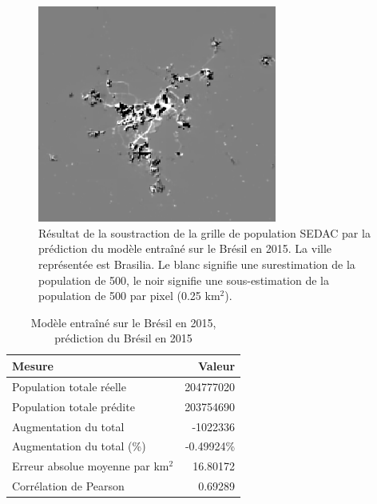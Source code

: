 \documentclass[a4paper, 11pt]{report}
\begin{document}
\begin{figure}
	\centering
	\includegraphics[width=0.7\textwidth]{img/act_vs_pred.png}
	\caption{Résultat de la soustraction de la grille de population SEDAC \cite{sedac} par la prédiction du modèle entraîné sur le Brésil en 2015. La ville représentée est Brasilia. Le blanc signifie une surestimation de la population de 500, le noir signifie une sous-estimation de la population de 500 par pixel (0.25 km$^2$).}
	\label{act_vs_pred}
\end{figure}

\begin{table}
	\centering
	\caption{Modèle entraîné sur le Brésil en 2015, prédiction du Brésil en 2015}
	\begin{tabular}{ l r }
		\hline
		\textbf{Mesure} & \textbf{Valeur} \\
		\hline\hline
		Population totale réelle & 204777020 \\
		\hline
		Population totale prédite & 203754690 \\
		\hline
		Augmentation du total & -1022336 \\
		\hline
		Augmentation du total (\%) & -0.49924\% \\
		\hline
		Erreur absolue moyenne par km$^2$ & 16.80172 \\
		\hline
		Corrélation de Pearson & 0.69289 \\
		\hline
	\end{tabular}
	\label{stats-brazil-brazil}
\end{table}
\end{document}

